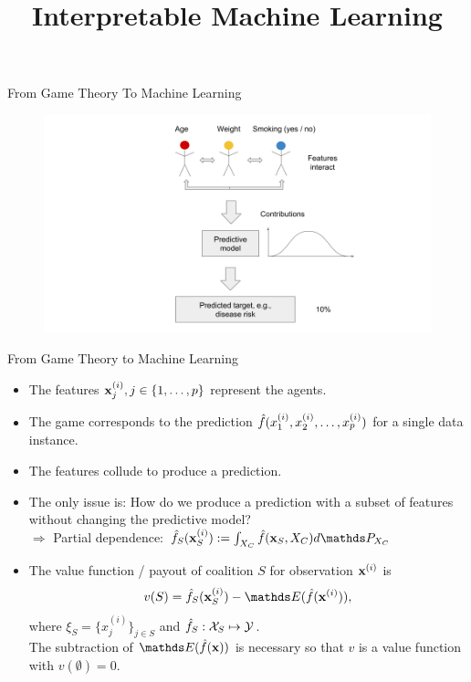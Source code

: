 \documentclass[11pt,compress,t,notes=noshow, aspectratio=169, xcolor=table]{beamer}
\title{Interpretable Machine Learning}
\date{}
\begin{document}
\newcommand{\titlefigure}{figure_man/shapley_valuefct.png}
\newcommand{\learninggoals}{
\item See model predictions as a cooperative game.
\item Transfer the Shapley value concept from game theory to machine learning.
}



\begin{vbframe}{From Game Theory To Machine Learning}

\begin{figure}
    \centering
    \includegraphics{slides/shapley/figure/Shapley_6.png}
\end{figure}

\end{vbframe}

\begin{vbframe}{From Game Theory to Machine Learning}
\begin{itemize}
    \itemsep1em
    \item The features $\xi_j, j \in \pset$ represent the agents.
    \item The game corresponds to the prediction $\fh(x^{(i)}_1, x^{(i)}_2, \ldots, x^{(i)}_p)$ for a single data instance.
    \item The features collude to produce a prediction.
    \item The only issue is: How do we produce a prediction with a subset of features without changing the predictive model?
    \\ $\Rightarrow$ Partial dependence: $\fh_{S}(\xv_S^{(i)}) := \int_{X_C} \fh(\xv_S, X_C)d \P_{X_C}$
    \item  The value function / payout of coalition $S$ for observation $\xv^{(i)}$ is
    $$v(S) =  \fh_{S} (\xi_S) - \E (\fh(\xi)),$$ 
    where $\xi_S = \{x_j^{(i)}\}_{j \in S}$ and $\fh_S: \Xspace_S \mapsto \Yspace$. \\ The subtraction of $\E(\fh(\xv))$ is necessary so that $v$ is a value function with $v(\emptyset) = 0$.
\end{itemize}
\end{vbframe}
\end{document}
